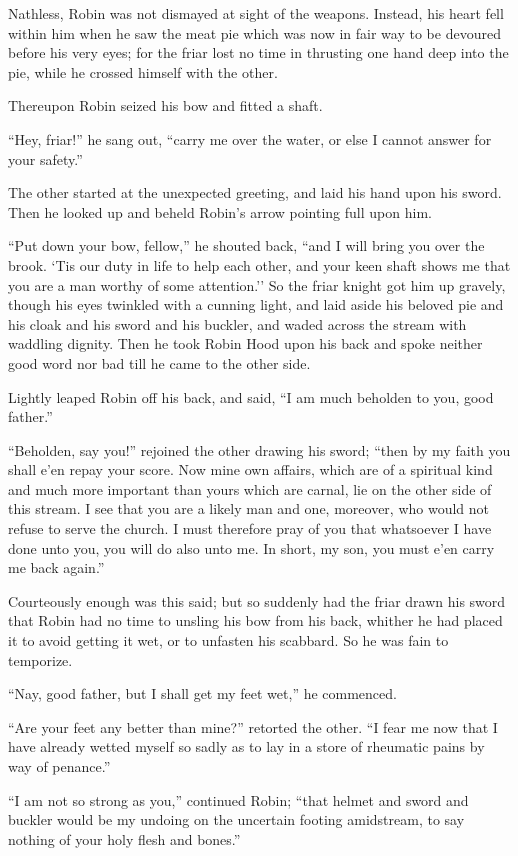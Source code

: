 Nathless, Robin was not dismayed at sight of the weapons. Instead, his
heart fell within him when he saw the meat pie which was now in fair way
to be devoured before his very eyes; for the friar lost no time in
thrusting one hand deep into the pie, while he crossed himself with the
other.

Thereupon Robin seized his bow and fitted a shaft.

``Hey, friar!'' he sang out, ``carry me over the water, or else I cannot
answer for your safety.''

The other started at the unexpected greeting, and laid his hand upon his
sword. Then he looked up and beheld Robin's arrow pointing full upon
him.

``Put down your bow, fellow,'' he shouted back, ``and I will bring you
over the brook. `Tis our duty in life to help each other, and your keen
shaft shows me that you are a man worthy of some attention.'' So the
friar knight got him up gravely, though his eyes twinkled with a cunning
light, and laid aside his beloved pie and his cloak and his sword and
his buckler, and waded across the stream with waddling dignity. Then he
took Robin Hood upon his back and spoke neither good word nor bad till
he came to the other side.

Lightly leaped Robin off his back, and said, ``I am much beholden to
you, good father.''

``Beholden, say you!'' rejoined the other drawing his sword; ``then by
my faith you shall e'en repay your score. Now mine own affairs, which
are of a spiritual kind and much more important than yours which are
carnal, lie on the other side of this stream. I see that you are a
likely man and one, moreover, who would not refuse to serve the church.
I must therefore pray of you that whatsoever I have done unto you, you
will do also unto me. In short, my son, you must e'en carry me back
again.''

Courteously enough was this said; but so suddenly had the friar drawn
his sword that Robin had no time to unsling his bow from his back,
whither he had placed it to avoid getting it wet, or to unfasten his
scabbard. So he was fain to temporize.

``Nay, good father, but I shall get my feet wet,'' he commenced.

``Are your feet any better than mine?'' retorted the other. ``I fear me
now that I have already wetted myself so sadly as to lay in a store of
rheumatic pains by way of penance.''

``I am not so strong as you,'' continued Robin; ``that helmet and sword
and buckler would be my undoing on the uncertain footing amidstream, to
say nothing of your holy flesh and bones.''

